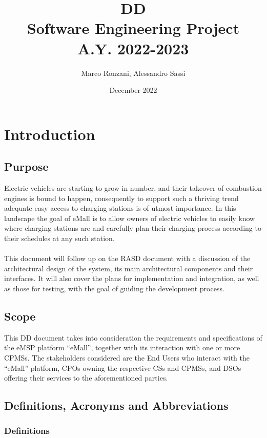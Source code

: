 \documentclass[11pt]{article}
\title{%
  \textbf{DD} \\
  \large Software Engineering Project \\ A.Y. 2022-2023}
\author{Marco Ronzani, Alessandro Sassi}
\date{December 2022}
\begin{document}
\maketitle

\doublespacing
\tableofcontents
\singlespacing

\section{Introduction}
\label{section:introduction}

\subsection{Purpose}

Electric vehicles are starting to grow in number, and their takeover of combustion engines is bound to happen, consequently to support such a thriving trend adequate easy access to charging stations is of utmost importance. In this landscape the goal of eMall is to allow owners of electric vehicles to easily know where charging stations are and carefully plan their charging process according to their schedules at any such station. \\
\\
This document will follow up on the RASD document with a discussion of the architectural design of the system, its main architectural components and their interfaces. It will also cover the plans for implementation and integration, as well as those for testing, with the goal of guiding the development process. \\

\subsection{Scope}

This DD document takes into consideration the requirements and specifications of the eMSP platform “eMall”, together with its interaction with one or more CPMSs. The stakeholders considered are the End Users who interact with the “eMall” platform, CPOs owning the respective CSs and CPMSs, and DSOs offering their services to the aforementioned parties.

\subsection{Definitions, Acronyms and Abbreviations}

\subsubsection{Definitions}
\end{document}
